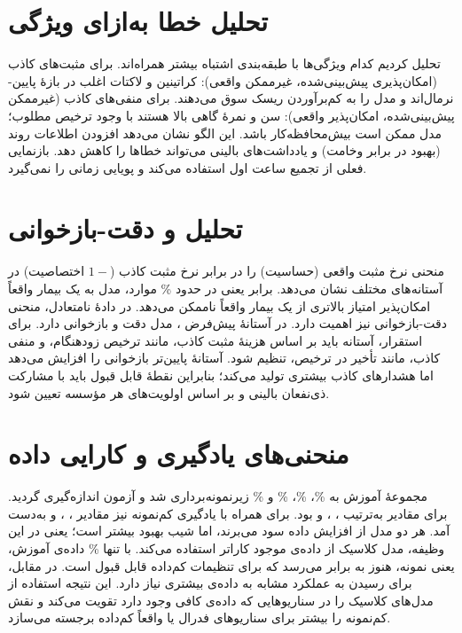 \section{تحلیل خطا به‌ازای ویژگی}

تحلیل کردیم کدام ویژگی‌ها با طبقه‌بندی اشتباه بیشتر همراه‌اند. برای مثبت‌های کاذب (امکان‌پذیری پیش‌بینی‌شده، غیرممکن واقعی): کراتینین و لاکتات اغلب در بازۀ پایین-نرمال‌اند و مدل را به کم‌برآوردن ریسک سوق می‌دهند. برای منفی‌های کاذب (غیرممکن پیش‌بینی‌شده، امکان‌پذیر واقعی): سن و نمرۀ  گاهی بالا هستند با وجود ترخیص مطلوب؛ مدل ممکن است بیش‌محافظه‌کار باشد. این الگو نشان می‌دهد افزودن اطلاعات روند (بهبود در برابر وخامت) و یادداشت‌های بالینی می‌تواند خطاها را کاهش دهد. بازنمایی فعلی از تجمیع  ساعت اول استفاده می‌کند و پویایی زمانی را نمی‌گیرد.

\section{تحلیل  و دقت-بازخوانی}

منحنی  نرخ مثبت واقعی (حساسیت) را در برابر نرخ مثبت کاذب ($1-$ اختصاصیت) در آستانه‌های مختلف نشان می‌دهد.  برابر  یعنی در حدود \% موارد، مدل به یک بیمار واقعاً امکان‌پذیر امتیاز بالاتری از یک بیمار واقعاً ناممکن می‌دهد. در دادۀ نامتعادل، منحنی دقت-بازخوانی نیز اهمیت دارد. در آستانۀ پیش‌فرض ، مدل  دقت  و بازخوانی  دارد. برای استقرار، آستانه باید بر اساس هزینۀ مثبت کاذب، مانند ترخیص زودهنگام، و منفی کاذب، مانند تأخیر در ترخیص، تنظیم شود. آستانۀ پایین‌تر بازخوانی را افزایش می‌دهد اما هشدارهای کاذب بیشتری تولید می‌کند؛ بنابراین نقطۀ قابل قبول باید با مشارکت ذی‌نفعان بالینی و بر اساس اولویت‌های هر مؤسسه تعیین شود.

\section{منحنی‌های یادگیری و کارایی داده}

مجموعۀ آموزش به \%، \%، \% و \% زیرنمونه‌برداری شد و  آزمون اندازه‌گیری گردید. برای  مقادیر به‌ترتیب ، ،  و  بود. برای  همراه با یادگیری کم‌نمونه نیز مقادیر ، ،  و  به‌دست آمد. هر دو مدل از افزایش داده سود می‌برند، اما شیب بهبود  بیشتر است؛ یعنی در این وظیفه، مدل کلاسیک از داده‌ی موجود کاراتر استفاده می‌کند. با تنها \% داده‌ی آموزش، یعنی  نمونه،  هنوز به  برابر  می‌رسد که برای تنظیمات کم‌داده قابل قبول است. در مقابل،  برای رسیدن به عملکرد مشابه به داده‌ی بیشتری نیاز دارد. این نتیجه استفاده از مدل‌های کلاسیک را در سناریوهایی که داده‌ی کافی وجود دارد تقویت می‌کند و نقش کم‌نمونه را بیشتر برای سناریوهای فدرال یا واقعاً کم‌داده برجسته می‌سازد.

